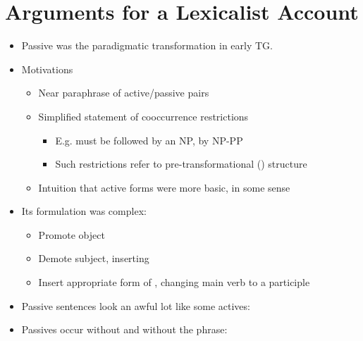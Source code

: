 \documentclass[a4paper,landscape,headrule,footrule]{foils}
\begin{document}
\maketitle




\overview
{}

\section[Arguments for a lexicalist account]{Arguments for a Lexicalist Account}


\begin{itemize}
\item Passive was the paradigmatic transformation in early TG.
\item Motivations
  \begin{itemize}
  \item Near paraphrase of active/passive pairs
  \item Simplified statement of cooccurrence restrictions
    \begin{itemize}
    \item E.g.  must be followed by an NP,  by NP-PP
    \item Such restrictions refer to pre-transformational () structure
    \end{itemize}
  \item Intuition that active forms were more basic, in some sense
  \end{itemize}
\item Its formulation was complex:  
  \begin{itemize}
  \item Promote object
  \item Demote subject, inserting 
  \item Insert appropriate form of , changing main verb to a participle
  \end{itemize}
\end{itemize}



\begin{itemize}
\item Passive sentences look an awful lot like some actives:  
  \begin{exe}
    \ex {}
    \ex {}
  \end{exe}
\item Passives occur without  and without the  phrase:
  \begin{exe}
    \ex {}
    \ex {}
  \end{exe}
\end{itemize}
\end{document}
